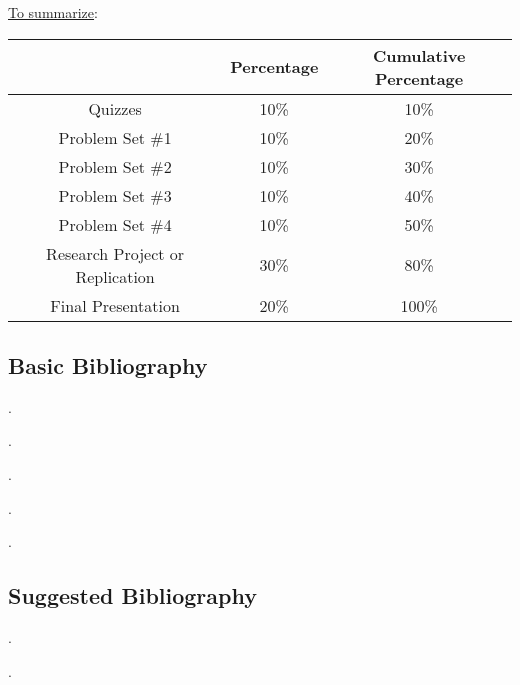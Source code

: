 \documentclass[letterpaper]{article}
\renewenvironment{itemize}{
  \begin{list}{}{
    \setlength{\leftmargin}{1.5em}
  }
}{
  \end{list}
}
\begin{document}
\begin{enumerate}
\end{enumerate}


\underline{To summarize}:

\begin{table}[H]
\centering
\begin{tabular}{ccc}
						  	& \textbf{Percentage} & {\bf Cumulative Percentage} \\
							\hline
Quizzes      	  & 10\%       	 & 10\% \\
\hline
Problem Set \#1 													 & 10\% 		 & 20\%  \\
Problem Set \#2 													 & 10\% 		 & 30\%  \\
Problem Set \#3 													 & 10\% 		 & 40\%  \\
Problem Set \#4 													 & 10\% 		 & 50\%  \\
\hline
Research Project or Replication						 & 30\% 	 	 & 80\% \\
Final Presentation												 & 20\% 	 	 & 100\% \\
\hline             
\end{tabular}
\end{table}


\subsection*{Basic Bibliography}

\begin{itemize}
  \item[$\bullet$] .
  \item[$\bullet$] .
  \item[$\bullet$] .
  \item[$\bullet$] .
  \item[$\bullet$] .
  \item[$\bullet$] 

\end{itemize}

\subsection*{Suggested Bibliography}

\begin{itemize}
  \item[$\bullet$] .
  \item[$\bullet$] .
\end{itemize}
\end{document}
